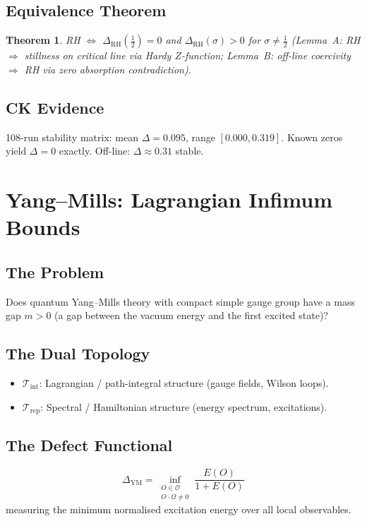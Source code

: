 \documentclass[12pt, openany]{book}
\newtheorem{theorem}{Theorem}[chapter]
\theoremstyle{remark}
\newcommand{\Tint}{\mathcal{T}_{\mathrm{int}}}
\newcommand{\Trep}{\mathcal{T}_{\mathrm{rep}}}
\begin{document}
\subsection{Equivalence Theorem}
\begin{theorem}
RH $\Longleftrightarrow$ $\Delta_{\mathrm{RH}}(\tfrac{1}{2}) = 0$ and
$\Delta_{\mathrm{RH}}(\sigma) > 0$ for $\sigma \neq \tfrac{1}{2}$
(Lemma~A: RH $\Rightarrow$ stillness on critical line via Hardy $Z$-function;
Lemma~B: off-line coercivity $\Rightarrow$ RH via zero absorption contradiction).
\end{theorem}

\subsection{CK Evidence}
108-run stability matrix: mean $\Delta = 0.095$, range $[0.000, 0.319]$.
Known zeros yield $\Delta = 0$ exactly. Off-line: $\Delta \approx 0.31$ stable.


\section{Yang--Mills: Lagrangian Infimum Bounds}
\label{sec:ym}

\subsection{The Problem}
Does quantum Yang--Mills theory with compact simple gauge group have a mass gap
$m > 0$ (a gap between the vacuum energy and the first excited state)?

\subsection{The Dual Topology}
\begin{itemize}
  \item $\Tint$: Lagrangian / path-integral structure (gauge fields, Wilson loops).
  \item $\Trep$: Spectral / Hamiltonian structure (energy spectrum, excitations).
\end{itemize}

\subsection{The Defect Functional}
\[
  \boxed{\Delta_{\mathrm{YM}} = \inf_{\substack{O \in \mathcal{O} \\ O \cdot \Omega \neq 0}} \frac{E(O)}{1 + E(O)}}
\]
measuring the minimum normalised excitation energy over all local observables.
\end{document}
